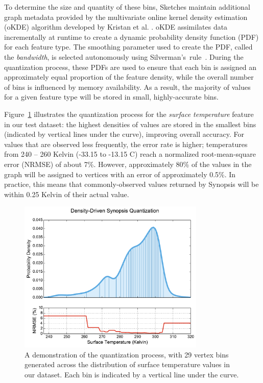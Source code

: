 To determine the size and quantity of these bins, Sketches maintain additional graph metadata provided by the multivariate online kernel density estimation (oKDE) algorithm developed by Kristan et al. \cite{kristan2011multivariate}. oKDE assimilates data incrementally at runtime to create a dynamic probability density function (PDF) for each feature type. The smoothing parameter used to create the PDF, called the \emph{bandwidth}, is selected autonomously using Silverman's~rule~\cite{silverman1986density}. During the quantization process, these PDFs are used to ensure that each bin is assigned an approximately equal proportion of the feature density, while the overall number of bins is influenced by memory availability. As a result, the majority of values for a given feature type will be stored in small, highly-accurate bins.

Figure~\ref{fig:quantization} illustrates the quantization process for the \emph{surface temperature} feature in our test dataset: the highest densities of values are stored in the smallest bins (indicated by vertical lines under the curve), improving overall accuracy. For values that are observed less frequently, the error rate is higher; temperatures from 240 -- 260 Kelvin (-33.15 to -13.15 \degree C) reach a normalized root-mean-square error (NRMSE) of about 7\%. However, approximately 80\% of the values in the graph will be assigned to vertices with an error of approximately 0.5\%. In practice, this means that commonly-observed values returned by Synopsis will be within 0.25 Kelvin of their actual value.

\begin{figure}
    \centerline{\includegraphics[width=3.5in]{figures/quantization.pdf}}
    \caption{A demonstration of the quantization process, with 29 vertex bins generated across the distribution of surface temperature values in our dataset. Each bin is indicated by a vertical line under the curve.}
    \label{fig:quantization}
\end{figure}

